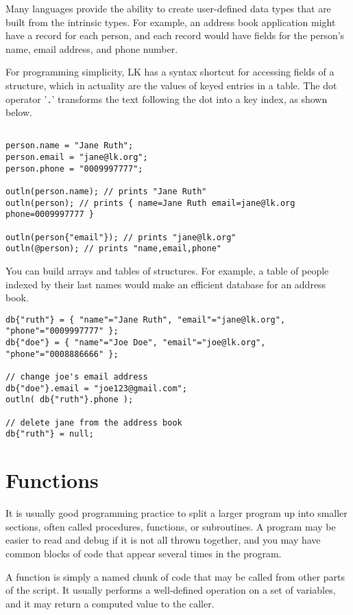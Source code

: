 \documentclass{article}
\begin{document}
Many languages provide the ability to create user-defined data types that are built from the intrinsic types.  For example, an address book application might have a record for each person, and each record would have fields for the person's name, email address, and phone number.  

For programming simplicity, LK has a syntax shortcut for accessing fields of a structure, which in actuality are the values of keyed entries in a table.  The dot operator '\texttt{.}' transforms the text following the dot into a key index, as shown below.

\begin{verbatim}

person.name = "Jane Ruth";
person.email = "jane@lk.org";
person.phone = "0009997777";

outln(person.name); // prints "Jane Ruth"
outln(person); // prints { name=Jane Ruth email=jane@lk.org phone=0009997777 }

outln(person{"email"}); // prints "jane@lk.org"
outln(@person); // prints "name,email,phone"

\end{verbatim}

You can build arrays and tables of structures.  For example, a table of people indexed by their last names would make an efficient database for an address book.

\begin{verbatim}
db{"ruth"} = { "name"="Jane Ruth", "email"="jane@lk.org", "phone"="0009997777" };
db{"doe"} = { "name"="Joe Doe", "email"="joe@lk.org", "phone"="0008886666" };

// change joe's email address
db{"doe"}.email = "joe123@gmail.com";
outln( db{"ruth"}.phone );

// delete jane from the address book
db{"ruth"} = null;

\end{verbatim}

\section{Functions}

It is usually good programming practice to split a larger program up into smaller sections, often called procedures, functions, or subroutines.  A program may be easier to read and debug if it is not all thrown together, and you may have common blocks of code that appear several times in the program.

A function is simply a named chunk of code that may be called from other parts of the script.  It usually performs a well-defined operation on a set of variables, and it may return a computed value to the caller.
\end{document}

